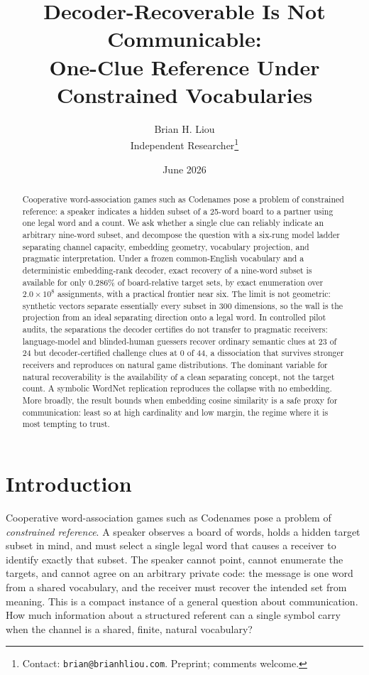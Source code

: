 \documentclass[11pt]{article}
\title{Decoder-Recoverable Is Not Communicable:\\
One-Clue Reference Under Constrained Vocabularies}
\author{Brian H. Liou\\\small Independent Researcher\thanks{Contact: \texttt{brian@brianhliou.com}. Preprint; comments welcome.}}
\date{June 2026}
\begin{document}
\maketitle

\begin{abstract}
Cooperative word-association games such as Codenames pose a problem of
constrained reference: a speaker indicates a hidden subset of a 25-word board to
a partner using one legal word and a count. We ask whether a single clue can
reliably indicate an arbitrary nine-word subset, and decompose the question with
a six-rung model ladder separating channel capacity, embedding geometry,
vocabulary projection, and pragmatic interpretation. Under a frozen
common-English vocabulary and a deterministic embedding-rank decoder, exact
recovery of a nine-word subset is available for only $0.286\%$ of board-relative
target sets, by exact enumeration over $2.0 \times 10^{8}$ assignments, with a
practical frontier near six. The limit is not geometric: synthetic vectors
separate essentially every subset in 300 dimensions, so the wall
is the projection from an ideal separating direction onto a legal word. In
controlled pilot audits, the separations the decoder certifies do not transfer
to pragmatic receivers: language-model and blinded-human guessers recover
ordinary semantic clues at 23 of 24 but decoder-certified challenge clues at 0
of 44, a dissociation that survives stronger receivers and reproduces on natural
game distributions. The dominant variable for natural recoverability is the
availability of a clean separating concept, not the target count. A symbolic
WordNet replication reproduces the collapse with no embedding. More broadly, the
result bounds when embedding cosine similarity is a safe proxy for communication:
least so at high cardinality and low margin, the regime where it is most tempting
to trust.
\end{abstract}

\section{Introduction}

Cooperative word-association games such as Codenames pose a problem of
\emph{constrained reference}. A speaker observes a board of words, holds a hidden
target subset in mind, and must select a single legal word that causes a
receiver to identify exactly that subset. The speaker cannot point, cannot
enumerate the targets, and cannot agree on an arbitrary private code: the message
is one word from a shared vocabulary, and the receiver must recover the intended
set from meaning. This is a compact instance of a general question about
communication. How much information about a structured referent can a single
symbol carry when the channel is a shared, finite, natural vocabulary?
\end{document}
